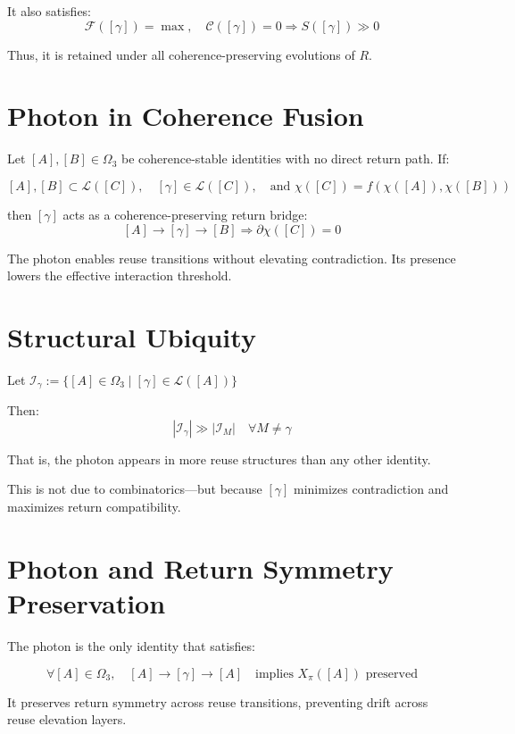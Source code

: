 It also satisfies:
\[
\mathcal{F}([\gamma]) = \max,\quad \mathcal{C}([\gamma]) = 0
\Rightarrow S([\gamma]) \gg 0
\]

Thus, it is retained under all coherence-preserving evolutions of $R$.

\section{Photon in Coherence Fusion} \label{sec:photon-fusion}

Let $[A], [B] \in \Omega_3$ be coherence-stable identities with no direct return path. If:

\[
[A], [B] \subset \mathcal{L}([C]),\quad [\gamma] \in \mathcal{L}([C]),\quad \text{and } \chi([C]) = f(\chi([A]), \chi([B]))
\]

then $[\gamma]$ acts as a coherence-preserving return bridge:
\[
[A] \to [\gamma] \to [B] \Rightarrow \partial\chi([C]) = 0
\]

The photon enables reuse transitions without elevating contradiction. Its presence lowers the effective interaction threshold.

\section{Structural Ubiquity} \label{sec:photon-ubiquity}

Let $\mathcal{I}_\gamma := \{ [A] \in \Omega_3 \mid [\gamma] \in \mathcal{L}([A]) \}$

Then:
\[
|\mathcal{I}_\gamma| \gg |\mathcal{I}_M| \quad \forall M \ne \gamma
\]

That is, the photon appears in more reuse structures than any other identity.

This is not due to combinatorics—but because $[\gamma]$ minimizes contradiction and maximizes return compatibility.

\section{Photon and Return Symmetry Preservation} \label{sec:photon-symmetry}

The photon is the only identity that satisfies:

\[
\forall [A] \in \Omega_3,\quad
[A] \to [\gamma] \to [A] \quad \text{implies } X_\pi([A]) \text{ preserved}
\]

It preserves return symmetry across reuse transitions, preventing drift across reuse elevation layers.

